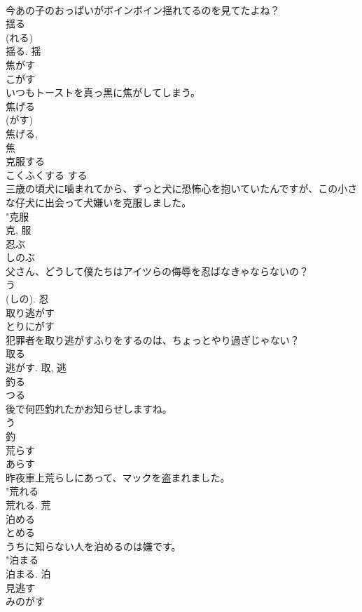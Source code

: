 \documentclass[8pt]{extreport}
\begin{document}
\begin{CJK}{UTF8}{min}
\\	今あの子のおっぱいがボインボイン揺れてるのを見てたよね？	
\\	揺る 
\\	(れる) 
\\	揺る.	揺	
\\	焦がす	
\\	こがす	
\\	いつもトーストを真っ黒に焦がしてしまう。	
\\	焦げる 
\\	(がす) 
\\	焦げる, 
\\	焦	
\\	克服する	
\\	こくふくする	する 
\\	三歳の頃犬に噛まれてから、ずっと犬に恐怖心を抱いていたんですが、この小さな仔犬に出会って犬嫌いを克服しました。	
\\	"克服 
\\	克, 服	
\\	忍ぶ	
\\	しのぶ	
\\	父さん、どうして僕たちはアイツらの侮辱を忍ばなきゃならないの？	
\\	う 
\\	(しの).	忍	
\\	取り逃がす	
\\	とりにがす	
\\	犯罪者を取り逃がすふりをするのは、ちょっとやり過ぎじゃない？	
\\	取る 
\\	逃がす.	取, 逃	
\\	釣る	
\\	つる	
\\	後で何匹釣れたかお知らせしますね。	
\\	う 
\\	釣	
\\	荒らす	
\\	あらす	
\\	昨夜車上荒らしにあって、マックを盗まれました。	
\\	"荒れる 
\\	荒れる.	荒	
\\	泊める	
\\	とめる	
\\	うちに知らない人を泊めるのは嫌です。	
\\	"泊まる 
\\	泊まる.	泊	
\\	見逃す	
\\	みのがす	

\end{CJK}
\end{document}
